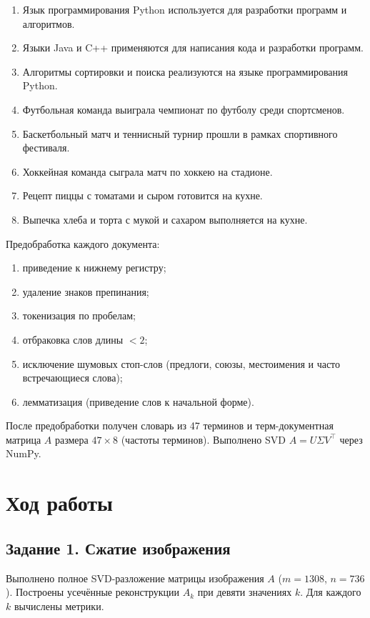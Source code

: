\documentclass[12pt,a4paper]{article}
\begin{document}
\begin{enumerate}
    \item Язык программирования Python используется для разработки программ и алгоритмов.
    \item Языки Java и C++ применяются для написания кода и разработки программ.
    \item Алгоритмы сортировки и поиска реализуются на языке программирования Python.
    \item Футбольная команда выиграла чемпионат по футболу среди спортсменов.
    \item Баскетбольный матч и теннисный турнир прошли в рамках спортивного фестиваля.
    \item Хоккейная команда сыграла матч по хоккею на стадионе.
    \item Рецепт пиццы с томатами и сыром готовится на кухне.
    \item Выпечка хлеба и торта с мукой и сахаром выполняется на кухне.
\end{enumerate}

Предобработка каждого документа:\begin{enumerate}
    \item приведение к нижнему регистру;
    \item удаление знаков препинания;
    \item токенизация по пробелам;
    \item отбраковка слов длины $<2$;
    \item исключение шумовых стоп-слов (предлоги, союзы, местоимения и часто
    встречающиеся слова);
    \item лемматизация (приведение слов к начальной форме).
\end{enumerate}

После предобработки получен словарь из 47 терминов и терм-документная матрица $A$
размера $47\times 8$ (частоты терминов). Выполнено SVD $A=U\Sigma V^\top$ через NumPy.

\section{Ход работы}

\subsection{Задание 1. Сжатие изображения}
Выполнено полное SVD-разложение матрицы изображения $A$ ($m=1308$, $n=736$).
Построены усечённые реконструкции $A_k$ при девяти значениях $k$. Для каждого $k$
вычислены метрики.
\end{document}
